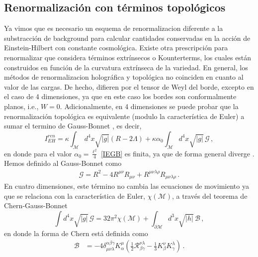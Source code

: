 \documentclass[../Main.tex]{subfiles}
\begin{document}
\subsection{Renormalización con términos topológicos}
Ya vimos que es necesario un esquema de renormalizacion diferente a la substracción de background para calcular cantidades conservadas en la acción de Einstein-Hilbert con constante cosmológica. Existe otra prescripción para renormalizar que considera términos extrínsecos o Kounterterms, los cuales están construidos en función de la curvatura extrínseca de la variedad. En general, los métodos de renormalizacion holográfica y topológica no coinciden en cuanto al valor de las cargas. De hecho, difieren por el tensor de Weyl del borde, excepto en el caso de 4 dimensiones, ya que en este caso los bordes son conformalmente planos, i.e., $W=0$. Adicionalmente, en 4 dimensiones se puede probar que la renormalización topológica es equivalente (modulo la característica de Euler) a sumar el termino de Gauss-Bonnet \cite{Aros:1999id,Aros:1999kt,Olea_2007,Olea:2005gb}, es decir,
\begin{equation} 
    I_{EH}^{ren}=\kappa \int_{\mathcal{M}} d^{4}x \sqrt{\lvert g\rvert} (R-2\Lambda) + \kappa \alpha_{0}\int_{\mathcal{M}} d^{4}x \sqrt{\lvert g\rvert}\,\mathcal{G} \, , \label{IEGB}
\end{equation}
en donde para el valor $\alpha_{0}=\tfrac{\ell^2}{4}$  \eqref{IEGB} es finita, ya que de forma general diverge \cite{Olea:2005gb,Olea_2007,Aros:1999id,Aros:1999kt}. Hemos definido al Gauss-Bonnet como
\begin{align}
    \mathcal{G}=R^2 -4R^{\mu\nu}R_{\mu\nu}+R^{\mu\nu\lambda\rho}R_{\mu\nu\lambda\rho} \, .
\end{align}
En cuatro dimensiones, este término no cambia las ecuaciones de movimiento ya que se relaciona con la característica de Euler, $\chi(\mathcal{M})$, a través del teorema de Chern-Gauss-Bonnet
\begin{equation}
    \int d^{4}x \sqrt{\lvert g\rvert}\,\mathcal{G}=32\pi^2\chi(\mathcal{M}) + \int_{\partial{\mathcal{M}}}d^{3}x\sqrt{\lvert h\rvert}\,\mathcal{B}\,,
\end{equation}
en donde la forma de Chern está definida como
\begin{align}
    \mathcal{B}&=-4\delta^{\alpha\beta\gamma}_{\mu\nu\lambda}K^{\mu}_{\alpha}\left(\frac{1}{2}\mathcal{R}^{\nu\lambda}_{\beta\gamma}-\frac{1}{3}K^{\nu}_{\beta}K^{\lambda}_{\gamma}\right)\,.
\end{align}
\end{document}

